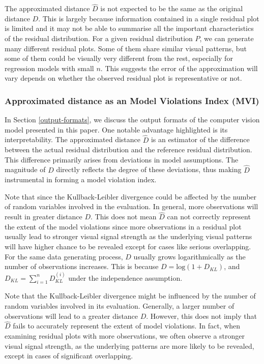 \documentclass[]{interact}
\theoremstyle{plain}%
\theoremstyle{definition}
\theoremstyle{remark}
\begin{document}
The approximated distance \(\hat{D}\) is not expected to be the same as
the original distance \(D\). This is largely because information
contained in a single residual plot is limited and it may not be able to
summarise all the important characteristics of the residual
distribution. For a given residual distribution \(P\), we can generate
many different residual plots. Some of them share similar visual
patterns, but some of them could be visually very different from the
rest, especially for regression models with small \(n\). This suggests
the error of the approximation will vary depends on whether the observed
residual plot is representative or not.

\hypertarget{approximated-distance-as-an-model-violations-index-mvi}{%
\subsubsection{Approximated distance as an Model Violations Index
(MVI)}\label{approximated-distance-as-an-model-violations-index-mvi}}

In Section \ref{output-formats}, we discuss the output formats of the
computer vision model presented in this paper. One notable advantage
highlighted is its interpretability. The approximated distance
\(\hat{D}\) is an estimator of the difference between the actual
residual distribution and the reference residual distribution. This
difference primarily arises from deviations in model assumptions. The
magnitude of \(D\) directly reflects the degree of these deviations,
thus making \(\hat{D}\) instrumental in forming a model violation index.

Note that since the Kullback-Leibler divergence could be affected by the
number of random variables involved in the evaluation. In general, more
observations will result in greater distance \(D\). This does not mean
\(\hat{D}\) can not correctly represent the extent of the model
violations since more observations in a residual plot usually lead to
stronger visual signal strength as the underlying visual patterns will
have higher chance to be revealed except for cases like serious
overlapping. For the same data generating process, \(D\) usually grows
logarithmically as the number of observations increases. This is because
\(D = \text{log}(1 + D_{KL})\), and
\(D_{KL} = \sum_{i=1}^{n}D_{KL}^{(i)}\) under the independence
assumption.

Note that the Kullback-Leibler divergence might be influenced by the
number of random variables involved in its evaluation. Generally, a
larger number of observations will lead to a greater distance \(D\).
However, this does not imply that \(\hat{D}\) fails to accurately
represent the extent of model violations. In fact, when examining
residual plots with more observations, we often observe a stronger
visual signal strength, as the underlying patterns are more likely to be
revealed, except in cases of significant overlapping.
\end{document}
